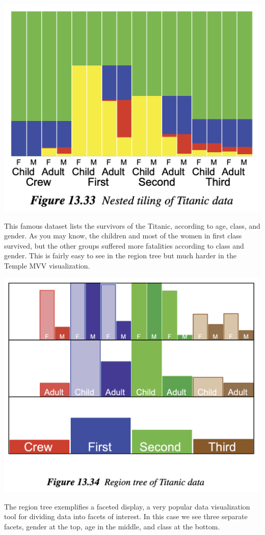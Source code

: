 \includegraphics{fiTitanicTempleMVV.png}

This famous dataset lists the survivors of the Titanic, according to
age, class, and gender. As you may know, the children and most of the
women in first class survived, but the other groups suffered more
fatalities according to class and gender. This is fairly easy to see in
the region tree but much harder in the Temple MVV visualization.

\includegraphics{fiTitanicRegionTree.png}

The region tree exemplifies a faceted display, a very popular data
visualization tool for dividing data into facets of interest. In this
case we see three separate facets, gender at the top, age in the middle,
and class at the bottom.

